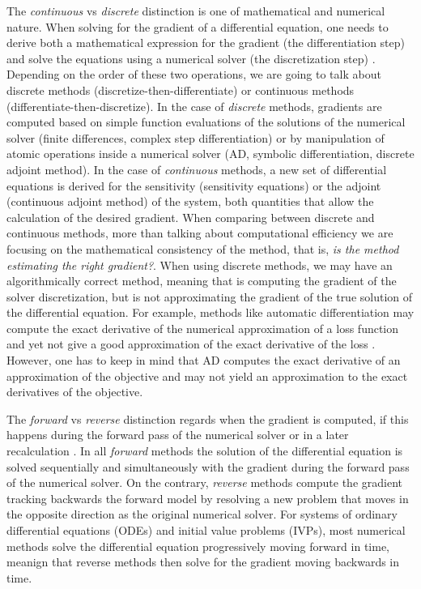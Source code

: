 The \textit{continuous} vs \textit{discrete} distinction is one of mathematical and numerical nature. 
When solving for the gradient of a differential equation, one needs to derive both a mathematical expression for the gradient (the differentiation step) and solve the equations using a numerical solver (the discretization step) \cite{bradley2013pde, Onken_Ruthotto_2020, FATODE2014, Sirkes_Tziperman_1997}. 
Depending on the order of these two operations, we are going to talk about discrete methods (discretize-then-differentiate) or continuous methods (differentiate-then-discretize). 
In the case of \textit{discrete} methods, gradients are computed based on simple function evaluations of the solutions of the numerical solver (finite differences, complex step differentiation) or by manipulation of atomic operations inside a numerical solver (AD, symbolic differentiation, discrete adjoint method). 
In the case of \textit{continuous} methods, a new set of differential equations is derived for the sensitivity (sensitivity equations) or the adjoint (continuous adjoint method) of the system, both quantities that allow the calculation of the desired gradient.   
When comparing between discrete and continuous methods, more than talking about computational efficiency we are focusing on the mathematical consistency of the method, that is, \textit{is the method estimating the right gradient?}. 
When using discrete methods, we may have an algorithmically correct method, meaning that is computing the gradient of the solver discretization, but is not approximating the gradient of the true solution of the differential equation. 
For example, methods like automatic differentiation may compute the exact derivative of the numerical approximation of a loss function and yet not give a good approximation of the exact derivative of the loss \cite{Walther_2007}.
However, one has to keep in mind that AD computes the exact derivative of an approximation of the objective and may not yield an approximation to the exact derivatives of the objective.

The \textit{forward} vs \textit{reverse} distinction regards when the gradient is computed, if this happens during the forward pass of the numerical solver or in a later recalculation \cite{Griewank:2008kh}. 
In all \textit{forward} methods the solution of the differential equation is solved sequentially and simultaneously with the gradient during the forward pass of the numerical solver.  
On the contrary, \textit{reverse} methods compute the gradient tracking backwards the forward model by resolving a new problem that moves in the opposite direction as the original numerical solver. 
For systems of ordinary differential equations (ODEs) and initial value problems (IVPs), most numerical methods solve the differential equation progressively moving forward in time, meanign that reverse methods then solve for the gradient moving backwards in time. 


